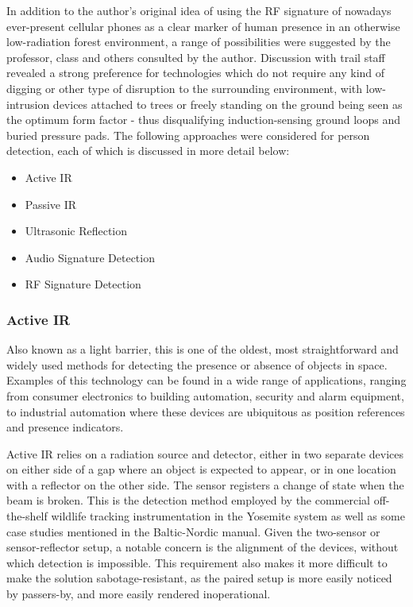 \documentclass[10pt,nocopyrightspace]{ewsn-proc}
\begin{document}
In addition to the author’s original idea of using the RF signature of nowadays ever-present cellular phones as a clear marker of human presence in an otherwise low-radiation forest environment, a range of possibilities were suggested by the professor, class and others consulted by the author. Discussion with trail staff revealed a strong preference for technologies which do not require any kind of digging or other type of disruption to the surrounding environment, with low-intrusion devices attached to trees or freely standing on the ground being seen as the optimum form factor - thus disqualifying induction-sensing ground loops and buried pressure pads. The following approaches were considered for person detection, each of which is discussed in more detail below:
\begin{itemize}
\item Active IR
\item Passive IR
\item Ultrasonic Reflection
\item Audio Signature Detection
\item RF Signature Detection
\end{itemize}


\subsubsection{Active IR}
Also known as a light barrier, this is one of the oldest, most straightforward and widely used methods for detecting the presence or absence of objects in space. Examples of this technology can be found in a wide range of applications, ranging from consumer electronics to building automation, security and alarm equipment, to industrial automation where these devices are ubiquitous as position references and presence indicators.

Active IR relies on a radiation source and detector, either in two separate devices on either side of a gap where an object is expected to appear, or in one location with a reflector on the other side. The sensor registers a change of state when the beam is broken. This is the detection method employed by the commercial off-the-shelf wildlife tracking instrumentation in the Yosemite system\cite{Pettebone:Yosemite} as well as some case studies mentioned in the Baltic-Nordic manual\cite{Kajala:Baltic}. Given the two-sensor or sensor-reflector setup, a notable concern is the alignment of the devices, without which detection is impossible. This requirement also makes it more difficult to make the solution sabotage-resistant, as the paired setup is more easily noticed by passers-by, and more easily rendered inoperational.
\end{document}
